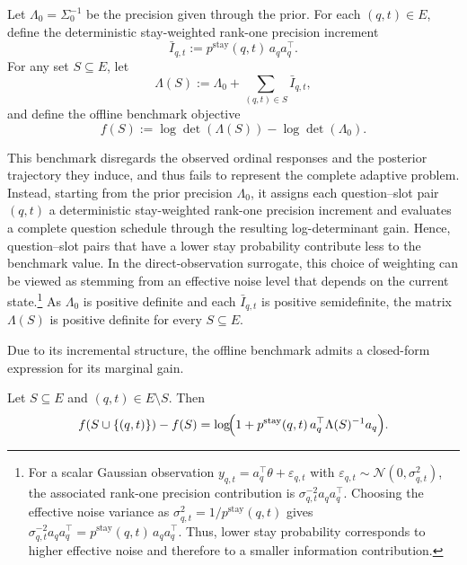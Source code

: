 \documentclass{article}
\begin{document}
\begin{definition}
Let $\Lambda_0 = \Sigma^{-1}_0$ be the precision given through the prior. For each $(q,t)\in E$, define the deterministic stay-weighted rank-one precision
increment
\begin{equation}
    \bar I_{q,t} := p^{\text{stay}}(q,t)\, a_q a_q^\top . \label{eq:increment}
\end{equation}
For any set $S\subseteq E$, let
\[
\Lambda(S) := \Lambda_0 + \sum_{(q,t)\in S} \bar I_{q,t},
\]
and define the offline benchmark objective
\begin{equation}\label{eq:off_obj}
   f(S) := \log\det(\Lambda(S)) - \log\det(\Lambda_0). 
\end{equation}

\end{definition}
This benchmark disregards the observed ordinal responses and the posterior trajectory they induce, and thus fails to represent the complete adaptive problem. Instead, starting from the
prior precision $\Lambda_0$, it assigns each question--slot pair $(q,t)$ a deterministic
stay-weighted rank-one precision increment
and evaluates a complete question schedule through the resulting log-determinant gain. Hence,
question–slot pairs that have a lower stay probability contribute less to the benchmark value. In the direct-observation surrogate, this choice of weighting can be viewed as stemming from an effective noise level that depends on the current state.\footnote{For a scalar Gaussian observation
$y_{q,t}=a_q^\top\theta+\varepsilon_{q,t}$ with
$\varepsilon_{q,t}\sim\mathcal N(0,\sigma_{q,t}^2)$, the associated rank-one
precision contribution is $\sigma_{q,t}^{-2} a_q a_q^\top$. Choosing the effective
noise variance as $\sigma_{q,t}^2=1/p^{\text{stay}}(q,t)$ gives
$\sigma_{q,t}^{-2} a_q a_q^\top
= p^{\text{stay}}(q,t)\,a_q a_q^\top$. Thus, lower stay probability corresponds
to higher effective noise and therefore to a smaller information contribution.} As $\Lambda_0$ is positive definite and each $\bar I_{q,t}$ is positive semidefinite, the matrix $\Lambda(S)$
is positive definite for every $S\subseteq E$.

Due to its incremental structure, the offline benchmark admits a closed-form expression for its marginal gain.

\begin{prop}\label{prop:marginal}
Let $S\subseteq E$ and $(q,t)\in E\setminus S$. Then
\[
f(S\cup\{(q,t)\}) - f(S)
=
\log\!\Bigl(1 + p^{\text{stay}}(q,t)\, a_q^\top \Lambda(S)^{-1} a_q\Bigr).
\]
\end{prop}
\end{document}
